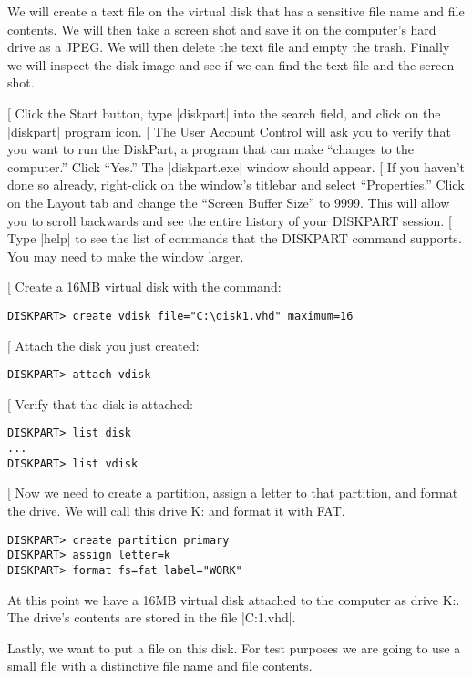 \documentclass[11pt,letter]{book}
\makeatletter
\def\step{%
   \@ifnextchar[ \@step{\@noitemargtrue\@step[\@itemlabel]}}
\def\@step[#1]{\item[#1]\mbox{}\hspace*{\dimexpr-\labelwidth-\labelsep}}
\makeatother
\begin{document}
We will create a text file on the virtual disk that has a sensitive file
name and file contents. We will then take a screen shot and save it on
the computer's hard drive as a JPEG. We will then delete the text file
and empty the trash. Finally we will inspect the disk image and see if
we can find the text file and the screen shot.



\begin{steps}
\step Click the Start button, type |diskpart| into the search field,
and click on the |diskpart| program icon.
\step The User Account Control will ask you to verify that you want to
run the DiskPart, a program that can make ``changes to the computer.''
Click ``Yes.''  The |diskpart.exe| window should appear.
\step If you haven't done so already, right-click on the window's
titlebar and select ``Properties.'' Click on the Layout tab and change
the ``Screen Buffer Size'' to 9999. This will allow you to scroll
backwards and see the entire history of your DISKPART session.
\step Type |help| to see the list of commands that the DISKPART
command supports. You may need to make the window larger.

\step Create a 16MB virtual disk with the command:

\begin{Verbatim}
DISKPART> create vdisk file="C:\disk1.vhd" maximum=16
\end{Verbatim}

\step Attach the disk you just created:
\begin{Verbatim}
DISKPART> attach vdisk
\end{Verbatim}

\step Verify that the disk is attached:
\begin{Verbatim}
DISKPART> list disk
...
DISKPART> list vdisk
\end{Verbatim}

\step Now we need to create a partition, assign a letter to that
partition, and format the drive. We will call this drive K: and format
it with FAT. 
\begin{Verbatim}
DISKPART> create partition primary
DISKPART> assign letter=k
DISKPART> format fs=fat label="WORK"
\end{Verbatim}

At this point we have a 16MB virtual disk attached to the computer as
drive K:. The drive's contents are stored in the file |C:\disk1.vhd|.

Lastly, we want to put a file on this disk. For test purposes we are
going to use a small file with a distinctive file name and file
contents.


\end{steps}
\end{document}
